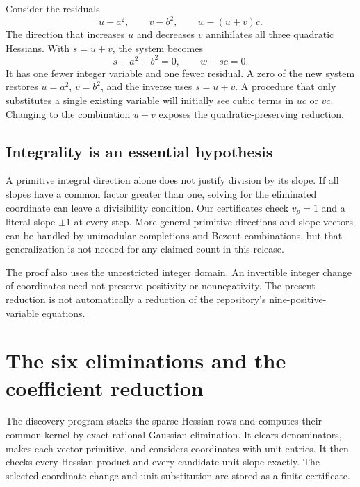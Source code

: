 \documentclass[10pt,letterpaper]{article}
\theoremstyle{definition}\newtheorem{remark}[theorem]{Remark}
\begin{document}
Consider the residuals
\[
 u-a^2,\qquad v-b^2,\qquad w-(u+v)c.
\]
The direction that increases $u$ and decreases $v$ annihilates all three
quadratic Hessians. With $s=u+v$, the system becomes
\[
 s-a^2-b^2=0,\qquad w-sc=0.
\]
It has one fewer integer variable and one fewer residual. A zero of the
new system restores $u=a^2$, $v=b^2$, and the inverse uses $s=u+v$.
A procedure that only substitutes a single existing variable will initially
see cubic terms in $uc$ or $vc$. Changing to the combination $u+v$ exposes
the quadratic-preserving reduction.

\subsection{Integrality is an essential hypothesis}

A primitive integral direction alone does not justify division by its
slope. If all slopes have a common factor greater than one, solving for
the eliminated coordinate can leave a divisibility condition. Our
certificates check $v_p=1$ and a literal slope $\pm1$ at every step.
More general primitive directions and slope vectors can be handled by
unimodular completions and Bezout combinations, but that generalization
is not needed for any claimed count in this release.

The proof also uses the unrestricted integer domain. An invertible integer
change of coordinates need not preserve positivity or nonnegativity.
The present reduction is not automatically a reduction of the repository's
nine-positive-variable equations.

\section{The six eliminations and the coefficient reduction}

The discovery program stacks the sparse Hessian rows and computes their
common kernel by exact rational Gaussian elimination. It clears
denominators, makes each vector primitive, and considers coordinates with
unit entries. It then checks every Hessian product and every candidate
unit slope exactly. The selected coordinate change and unit substitution
are stored as a finite certificate.
\end{document}
